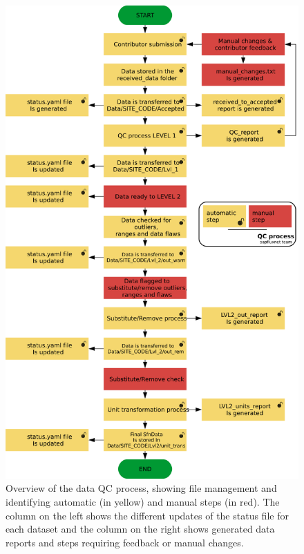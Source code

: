 \documentclass[11pt,twoside]{reedthesis}
\begin{document}
\setlength{\abovecaptionskip}{15pt}
\begin{figure}

{\centering \includegraphics[width=0.8\linewidth]{figure/appendixB/QCsummary2} 

}

\caption[Overview of the data QC process.]{Overview of the data QC process, showing file management and identifying automatic (in yellow) and manual steps (in red).  The column on the left shows the different updates of the status file for each dataset and the column on the right shows generated data reports and steps requiring feedback or manual changes.}\label{fig:unnamed-chunk-5}
\end{figure}
\setlength{\abovecaptionskip}{0pt} \newpage
\end{document}
